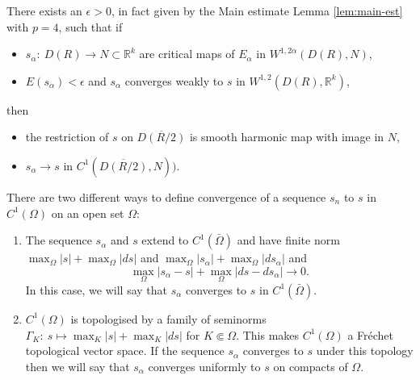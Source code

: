 \begin{lemma}[Key]
\label{lem:key-sacks-uhlenbeck}
There exists an \(\epsilon>0\), in fact given by the Main estimate Lemma \ref{lem:main-est} with
\(p=4\), such that if
\begin{itemize}
\item \(s_\alpha:\ D(R) \longrightarrow N\subset \mathbb{R}^k\) are critical maps of \(E_\alpha\) in \(W^{1, 2\alpha}(D(R),N)\),
\item \(E(s_\alpha) < \epsilon\) and \(s_\alpha\) converges weakly to \(s\) in \(W^{1,2}(D(R),\mathbb{R}^k)\),
\end{itemize}
then 
\begin{itemize}
\item the restriction of \(s\) on \(\overline{D(R/2)}\) is smooth harmonic map with image in \(N\),
\item \(s_\alpha \to s\) in \(C^1(\overline{D(R/2)},N))\).
\end{itemize}
\end{lemma}

\begin{remark}
\label{rem:topo-C1}
There are two different ways to define convergence of a sequence \(s_n\) to \(s\) in
\(C^1(\Omega)\) on an open set \(\Omega\):
\begin{enumerate}
\item The sequence \(s_\alpha\) and \(s\) extend to \(C^1(\bar\Omega)\) and have finite norm \(\max_\Omega |s| +
   \max_\Omega|ds|\) and \(\max_\Omega |s_\alpha| + \max_\Omega|ds_\alpha|\) and
\[
     \max_\Omega |s_\alpha - s| + \max_\Omega |ds-ds_\alpha| \to 0.
   \]
In this case, we will say that \(s_\alpha\) converges to \(s\) in \(C^1(\bar\Omega)\).
\item \(C^1(\Omega)\) is topologised by a family of seminorms
\(\Gamma_K:\ s\longmapsto \max_{K} |s| + \max_{K}|ds|\)
for \(K\Subset\Omega\). This makes \(C^1(\Omega)\) a Fréchet topological vector space.
If the sequence \(s_\alpha\) converges to \(s\) under this topology then we will
say that \(s_\alpha\) converges uniformly to \(s\) on compacts of \(\Omega\).
\end{enumerate}
\end{remark}

